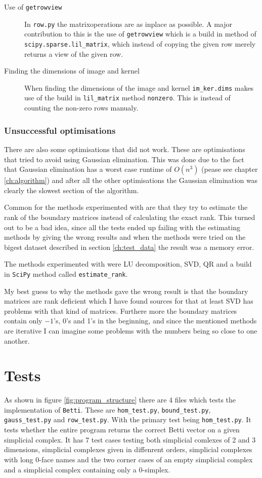 \documentclass[11pt,a4paper,twoside]{report}
\begin{document}
\begin{description}
\item[Use of \texttt{getrowview}] In \texttt{row.py} the matrixoperations are as inplace as possible. A major contribution to this is the use of \texttt{getrowview} which is a build in method of \texttt{scipy.sparse.lil\_matrix}, which instead of copying the given row merely returns a view of the given row. 
\item[Finding the dimensions of image and kernel] When finding the dimensions of the image and kernel \texttt{im\_ker.dims} makes use of the build in \texttt{lil\_matrix} method \texttt{nonzero}. This is instead of counting the non-zero rows manualy.
\end{description}
\subsubsection{Unsuccessful optimisations}
There are also some optimisations that did not work. These are optimisations that tried to avoid using Gaussian elimination. This was done due to the fact that Gaussian elimination has a worst case runtime of $O(n^3)$ (pease see chapter \ref{ch:algorithm}) and after all the other optimisations the Gaussian elimination was clearly the slowest section of the algorithm.

Common for the methods experimented with are that they try to estimate the rank of the boundary matrices instead of calculating the exact rank. This turned out to be a bad idea, since all the tests ended up failing with the estimating methods by giving the wrong results and when the methods were tried on the bigest dataset described in section \ref{ch:test_data} the result was a memory error. 

The methods experimented with were LU decomposition, SVD, QR and a build in \texttt{SciPy} method called \texttt{estimate\_rank}.

My best guess to why the methods gave the wrong result is that the boundary matrices are rank deficient which I have found sources for that at least SVD \cite{wikiSVD} has problems with that kind of matrices. Furthere more the boundary matrices contain only $-1$'s, 0's and 1's in the beginning, and since the mentioned methods are iterative I can imagine some problems with the numbers being so close to one another.
\section{Tests}
As shown in figure \ref{fig:program_structure} there are 4 files which tests the implementation of \texttt{Betti}. These are \texttt{hom\_test.py}, \texttt{bound\_test.py}, \texttt{gauss\_test.py} and \texttt{row\_test.py}. With the primary test being \texttt{hom\_test.py}. It tests whether the entire program returns the correct Betti vector on a given simplicial complex. It has 7 test cases testing both simplicial comlexes of 2 and 3 dimensions, simplicial complexes given in diffenrent orders, simplicial complexes with long 0-face names and the two corner cases of an empty simplicial complex and a simplicial complex containing only a 0-simplex. 
\end{document}
